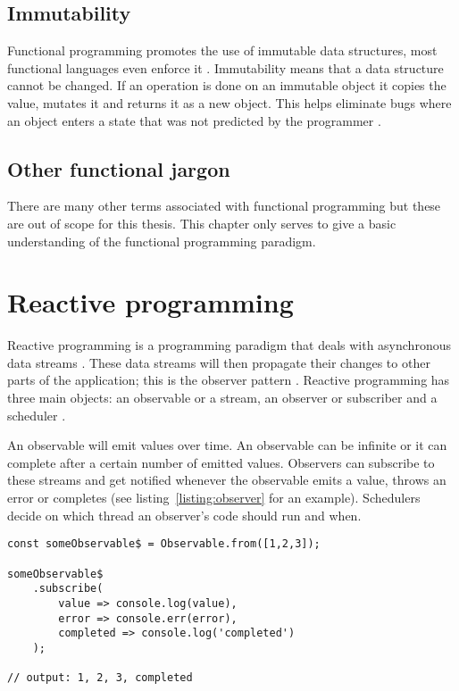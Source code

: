 \subsection{Immutability}

Functional programming promotes the use of immutable data structures, most functional languages even enforce it \cite{func-js}. Immutability means that a data structure cannot be changed. If an operation is done on an immutable object it copies the value, mutates it and returns it as a new object. This helps eliminate bugs where an object enters a state that was not predicted by the programmer \cite{intro-func}.

\subsection{Other functional jargon}

There are many other terms associated with functional programming but these are out of scope for this thesis. This chapter only serves to give a basic understanding of the functional programming paradigm.

\section{Reactive programming}
\label{sub:rp}

Reactive programming is a programming paradigm that deals with asynchronous data streams \cite{intro-reactive}. These data streams will then propagate their changes to other parts of the application; this is the observer pattern \cite{observer}. Reactive programming has three main objects: an observable or a stream, an observer or subscriber and a scheduler \cite{intro-reactive}.

An observable will emit values over time. An observable can be infinite or it can complete after a certain number of emitted values. Observers can subscribe to these streams and get notified whenever the observable emits a value, throws an error or completes (see listing~\ref{listing:observer} for an example). Schedulers decide on which thread an observer's code should run and when.

\begin{lstlisting}[caption=An observable and observer in RxJS,label=listing:observer]
const someObservable$ = Observable.from([1,2,3]);

someObservable$
	.subscribe(
		value => console.log(value),
		error => console.err(error),
		completed => console.log('completed')
	);
	
// output: 1, 2, 3, completed
\end{lstlisting}

